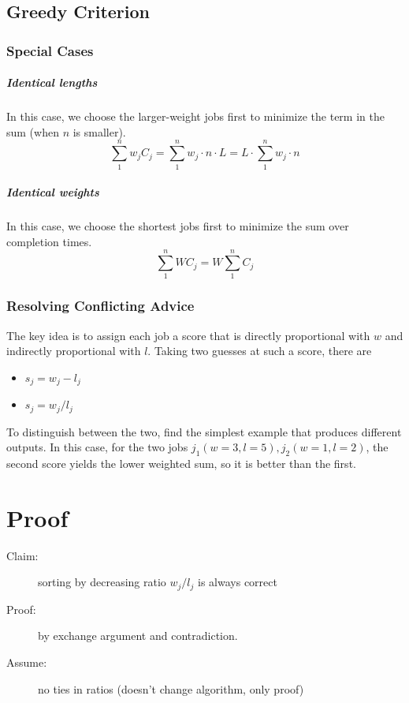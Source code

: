 \documentclass[11pt]{article}
\begin{document}
\subsection{Greedy Criterion}
	\subsubsection{Special Cases}
		\subparagraph{Identical lengths} In this case, we choose the larger-weight jobs first to minimize the term in the sum (when $n$ is smaller).
			\begin{equation}
				\sum_1^n w_jC_j = \sum_1^n w_j \cdot n \cdot L = L \cdot \sum_1^n w_j \cdot n
			\end{equation}
		\subparagraph{Identical weights} In this case, we choose the shortest jobs first to minimize the sum over completion times.
			\begin{equation}
				\sum_1^n WC_j = W\sum_1^n C_j
			\end{equation}
			
	\subsubsection{Resolving Conflicting Advice}
		The key idea is to assign each job a score that is directly proportional with $w$ and indirectly proportional with $l$. Taking two guesses at such a score, there are 
		\begin{itemize}
			\item $s_j = w_j - l_j$
			\item $s_j = w_j / l_j$
		\end{itemize}
		To distinguish between the two, find the simplest example that produces different outputs. In this case, for the two jobs $j_1(w=3, l=5), j_2(w=1,l=2)$, the second score yields the lower weighted sum, so it is better than the first.
		
\section{Proof}
	\begin{description}
		\item[Claim:] sorting by decreasing ratio $w_j / l_j$ is always correct
		\item[Proof:] by exchange argument and contradiction.
		\item[Assume:] no ties in ratios (doesn't change algorithm, only proof)
	\end{description}
	
\end{document}
